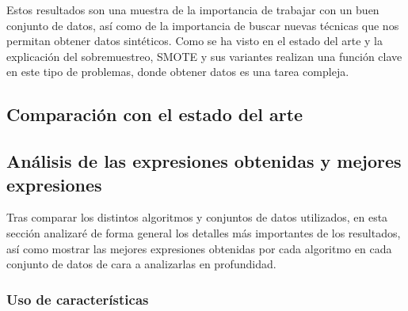 Estos resultados son una muestra de la importancia de trabajar con un buen conjunto de datos, así como de la importancia de buscar nuevas técnicas que nos permitan obtener datos sintéticos. Como se ha visto en el estado del arte y la explicación del sobremuestreo, SMOTE y sus variantes realizan una función clave en este tipo de problemas, donde obtener datos es una tarea compleja.

\subsection{Comparación con el estado del arte}





\subsection{Análisis de las expresiones obtenidas y mejores expresiones}


Tras comparar los distintos algoritmos y conjuntos de datos utilizados, en esta sección analizaré de forma general los detalles más importantes de los resultados, así como mostrar las mejores expresiones obtenidas por cada algoritmo en cada conjunto de datos de cara a analizarlas en profundidad.

\subsubsection{Uso de características}






\newpage
